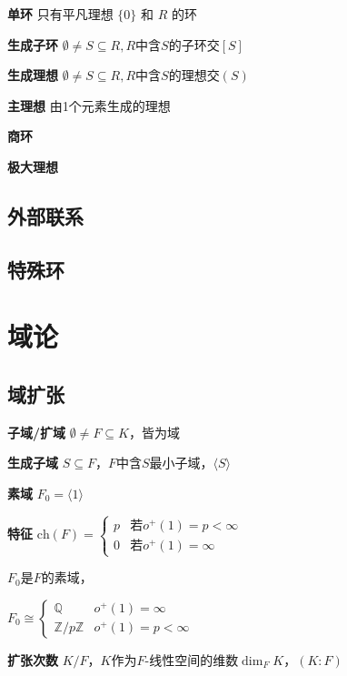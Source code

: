 \documentclass[a4paper,10pt]{ctexart}
\newcommand*{\setZ}{\mathbb{Z}}
\newcommand*{\setQ}{\mathbb{Q}}
\newcommand*{\genring}[1]{[#1]}
\newcommand*{\genideal}[1]{(#1)}
\newcommand*{\genfield}[1]{\langle #1 \rangle}
\newcommand{\ch}[1]{\text{ch}(#1)}
\begin{document}
\begin{multicols}{3}
    \textbf{单环} 只有平凡理想 $\{0\}$ 和 $R$ 的环

    \textbf{生成子环} $\emptyset \!\neq\! S \!\subseteq\! R, R$中含$\!S\!$的子环交$\genring{S}$

    \textbf{生成理想} $\emptyset \!\neq\! S \!\subseteq\! R, R$中含$\!S\!$的理想交$\genideal{S}$

    \textbf{主理想} 由1个元素生成的理想

    \textbf{商环}

    \textbf{极大理想}

    \subsection{外部联系}

    \subsection{特殊环}

    \section{域论}

    \subsection{域扩张}

    \textbf{子域/扩域} $\emptyset \ne F \subseteq K$，皆为域

    \textbf{生成子域} $S \subseteq F$，$F$中含$S$最小子域，$\genfield{S}$

    \textbf{素域} $F_0 = \genfield{1}$

    \textbf{特征} $\ch{F} = \begin{cases}
            p & \text{若}o^+(1) = p < \infty \\
            0 & \text{若}o^+(1) = \infty
        \end{cases}$

    \begin{theorem}[素域同构]
        $F_0$是$F$的素域，

        $F_0 \cong \begin{cases}
                \setQ        & o^+(1) = \infty     \\
                \setZ/p\setZ & o^+(1) = p < \infty
            \end{cases}$
    \end{theorem}

    \textbf{扩张次数} $K/F$，$K$作为$F$-线性空间的维数$\dim_F K$，$(K:F)$


\end{multicols}
\end{document}
